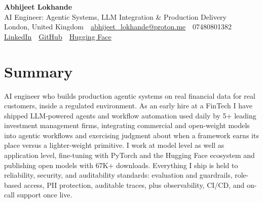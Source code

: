\documentclass[10pt,a4paper]{article}
\newcommand{\sep}{\,\textcolor{accent!60}{\textbar}\,}
\begin{document}
\begin{center}
  {\fontsize{24}{26}\selectfont\bfseries Abhijeet Lokhande}\\[3pt]
  {\color{accent}\large AI Engineer: Agentic Systems, LLM Integration \& Production Delivery}\\[5pt]
  {\small
    London, United Kingdom \sep
    \href{mailto:abhijeet_lokhande@proton.me}{abhijeet\_lokhande@proton.me} \sep
    07480801382 \\[2pt]
    \href{https://www.linkedin.com/in/ablds/}{LinkedIn} \sep
    \href{https://github.com/abhijeetscode}{GitHub} \sep
    \href{https://huggingface.co/ab-ai}{Hugging Face}
  }
\end{center}
\vspace{2pt}

\section{Summary}
AI engineer who builds production agentic systems on real financial data for real customers, inside a regulated environment. As an early hire at a FinTech I have shipped LLM-powered agents and workflow automation used daily by 5+ leading investment management firms, integrating commercial and open-weight models into agentic workflows and exercising judgment about when a framework earns its place versus a lighter-weight primitive. I work at model level as well as application level, fine-tuning with PyTorch and the Hugging Face ecosystem and publishing open models with 67K+ downloads. Everything I ship is held to reliability, security, and auditability standards: evaluation and guardrails, role-based access, PII protection, auditable traces, plus observability, CI/CD, and on-call support once live.

\end{document}
